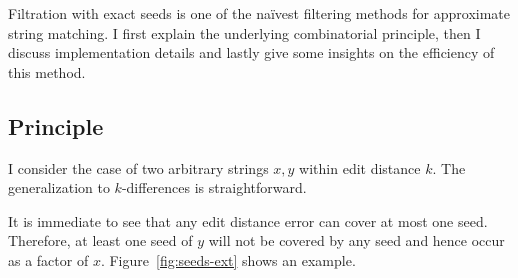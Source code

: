 Filtration with exact seeds is one of the na\"ivest filtering methods for approximate string matching.
I first explain the underlying combinatorial principle, then I discuss implementation details and lastly give some insights on the efficiency of this method.

\subsection{Principle}

I consider the case of two arbitrary strings $x,y$ within edit distance $k$.
The generalization to $k$-differences is straightforward.

It is immediate to see that any edit distance error can cover at most one seed.
Therefore, at least one seed of $y$ will not be covered by any seed and hence occur as a factor of $x$.
Figure~\ref{fig:seeds-ext} shows an example.

